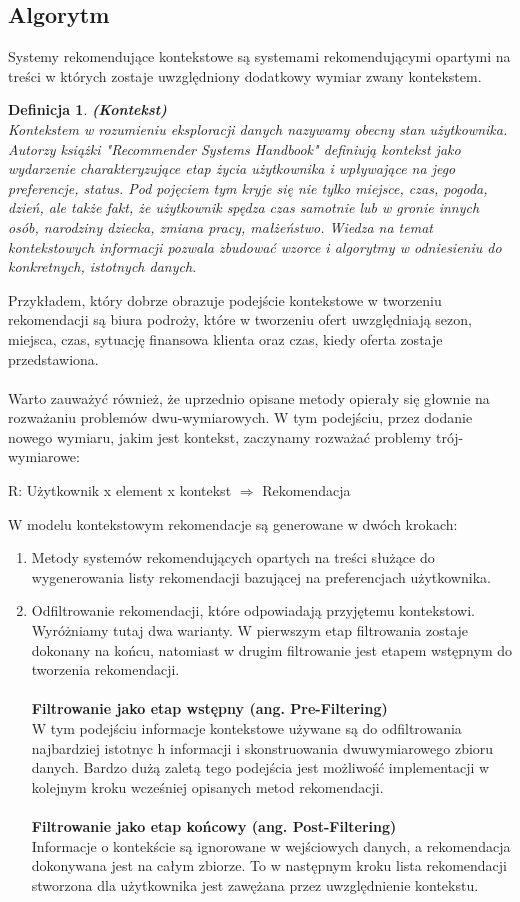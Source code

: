 \documentclass[12pt,a4paper]{report}
\newtheorem{df}{Definicja}
\begin{document}
{\subsection{Algorytm}
Systemy rekomendujące kontekstowe są systemami rekomendującymi opartymi na treści w których zostaje uwzględniony dodatkowy wymiar zwany kontekstem.

\begin{df}\textbf{(Kontekst)}
\\Kontekstem w rozumieniu eksploracji danych nazywamy obecny stan użytkownika. Autorzy książki "Recommender Systems Handbook" definiują kontekst jako wydarzenie charakteryzujące etap życia użytkownika i wpływające na jego preferencje, status. Pod pojęciem tym kryje się nie tylko miejsce, czas, pogoda, dzień, ale także fakt, że użytkownik spędza czas samotnie lub w gronie innych osób, narodziny dziecka, zmiana pracy, małżeństwo. Wiedza na temat kontekstowych informacji pozwala zbudować wzorce i algorytmy w odniesieniu do konkretnych, istotnych danych.
\end{df}
Przykładem, który dobrze obrazuje podejście kontekstowe w tworzeniu rekomendacji są biura podroży, które w tworzeniu ofert uwzględniają sezon, miejsca, czas, sytuację finansowa klienta oraz czas, kiedy oferta zostaje przedstawiona. 
\\
\\Warto zauważyć również, że uprzednio opisane metody opierały się głownie na rozważaniu problemów dwu-wymiarowych. W tym podejściu, przez dodanie nowego wymiaru, jakim jest kontekst, zaczynamy rozważać problemy trój-wymiarowe:
\begin{center}
R: Użytkownik x element x kontekst $ \Rightarrow$ Rekomendacja
\end{center}
W modelu kontekstowym rekomendacje są generowane w dwóch krokach:
\begin{enumerate}
\item Metody systemów rekomendujących opartych na treści służące do wygenerowania listy rekomendacji bazującej na  preferencjach użytkownika.
\item Odfiltrowanie rekomendacji, które odpowiadają przyjętemu kontekstowi.
\\Wyróżniamy tutaj dwa warianty. W pierwszym etap filtrowania zostaje dokonany na końcu, natomiast w drugim filtrowanie jest etapem wstępnym do tworzenia rekomendacji.
\\
\\
\textbf{Filtrowanie jako etap wstępny (ang. Pre-Filtering)}
\\W tym podejściu informacje kontekstowe używane są do odfiltrowania najbardziej istotnyc    h informacji i skonstruowania dwuwymiarowego zbioru danych. Bardzo dużą zaletą tego podejścia jest możliwość implementacji w kolejnym kroku wcześniej opisanych metod rekomendacji. 
\\
\\ \textbf{Filtrowanie jako etap końcowy (ang. Post-Filtering)}
\\Informacje o kontekście są ignorowane w wejściowych danych, a rekomendacja dokonywana jest na całym zbiorze. To w następnym kroku lista rekomendacji stworzona dla użytkownika jest zawężana przez uwzględnienie kontekstu.
\end{enumerate}
}
\end{document}
